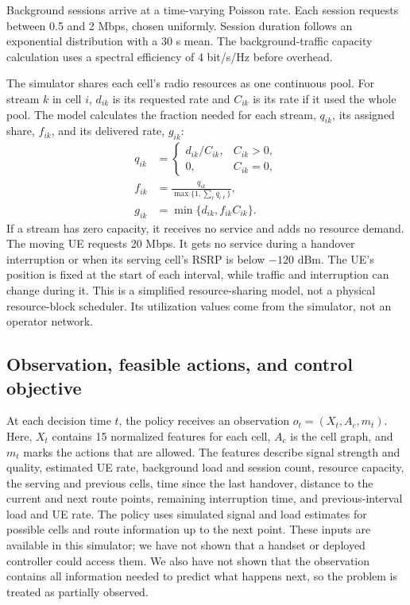 \documentclass[fleqn,10pt,twoside]{IOEGC}
\begin{document}
Background sessions arrive at a time-varying Poisson rate. Each session requests between 0.5 and 2 Mbps, chosen uniformly. Session duration follows an exponential distribution with a 30 s mean. The background-traffic capacity calculation uses a spectral efficiency of 4 bit/s/Hz before overhead.

The simulator shares each cell's radio resources as one continuous pool. For stream $k$ in cell $i$, $d_{ik}$ is its requested rate and $C_{ik}$ is its rate if it used the whole pool. The model calculates the fraction needed for each stream, $q_{ik}$, its assigned share, $f_{ik}$, and its delivered rate, $g_{ik}$:
\begin{equation}
  \begin{aligned}
  q_{ik}&=\begin{cases}d_{ik}/C_{ik},&C_{ik}>0,\\0,&C_{ik}=0,\end{cases}\\
  f_{ik}&=\frac{q_{ik}}{\max\{1,\sum_\ell q_{i\ell}\}},\\
  g_{ik}&=\min\{d_{ik},f_{ik}C_{ik}\}.
  \end{aligned}
  \label{eq:allocation}
\end{equation}
If a stream has zero capacity, it receives no service and adds no resource demand. The moving UE requests 20 Mbps. It gets no service during a handover interruption or when its serving cell's RSRP is below $-120$ dBm. The UE's position is fixed at the start of each interval, while traffic and interruption can change during it. This is a simplified resource-sharing model, not a physical resource-block scheduler. Its utilization values come from the simulator, not an operator network.

\subsection{Observation, feasible actions, and control objective}
At each decision time $t$, the policy receives an observation $o_t=(X_t,A_c,m_t)$. Here, $X_t$ contains 15 normalized features for each cell, $A_c$ is the cell graph, and $m_t$ marks the actions that are allowed. The features describe signal strength and quality, estimated UE rate, background load and session count, resource capacity, the serving and previous cells, time since the last handover, distance to the current and next route points, remaining interruption time, and previous-interval load and UE rate. The policy uses simulated signal and load estimates for possible cells and route information up to the next point. These inputs are available in this simulator; we have not shown that a handset or deployed controller could access them. We also have not shown that the observation contains all information needed to predict what happens next, so the problem is treated as partially observed.
\end{document}
